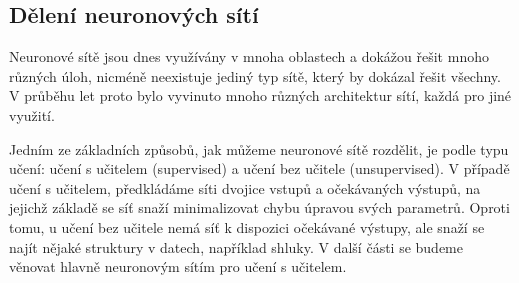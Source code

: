 






\subsection{Dělení neuronových sítí}

Neuronové sítě jsou dnes využívány v mnoha oblastech a dokážou řešit mnoho
různých úloh, nicméně neexistuje jediný typ sítě, který by dokázal řešit
všechny. V průběhu let proto bylo vyvinuto mnoho různých architektur sítí,
každá pro jiné využití.

Jedním ze základních způsobů, jak můžeme neuronové sítě rozdělit, je podle typu
učení: učení s učitelem (supervised) a učení bez učitele (unsupervised). V
případě učení s učitelem, předkládáme síti dvojice vstupů a očekávaných
výstupů, na jejichž základě se síť snaží minimalizovat chybu úpravou svých
parametrů. Oproti tomu, u učení bez učitele nemá síť k dispozici očekávané
výstupy, ale snaží se najít nějaké struktury v datech, například shluky. V
další části se budeme věnovat hlavně neuronovým sítím pro učení s učitelem.

